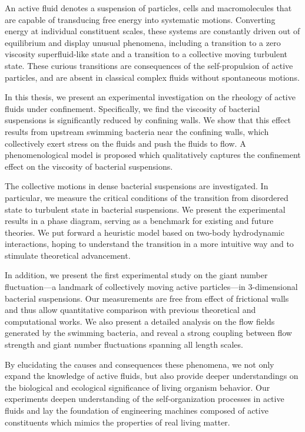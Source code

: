 An active fluid denotes a suspension of particles, cells and macromolecules that are capable of transducing free energy into systematic motions. Converting energy at individual constituent scales, these systems are constantly driven out of equilibrium and display unusual phenomena, including a transition to a zero viscosity superfluid-like state and a transition to a collective moving turbulent state. These curious transitions are consequences of the self-propulsion of active particles, and are absent in classical complex fluids without spontaneous motions.

In this thesis, we present an experimental investigation on the rheology of active fluids under confinement. Specifically, we find the viscosity of bacterial suspensions is significantly reduced by confining walls. We show that this effect results from upstream swimming bacteria near the confining walls, which collectively exert stress on the fluids and push the fluids to flow. A phenomenological model is proposed which qualitatively captures the confinement effect on the viscosity of bacterial suspensions.


The collective motions in dense bacterial suspensions are investigated. In particular, we measure the critical conditions of the transition from disordered state to turbulent state in bacterial suspensions. We present the experimental results in a phase diagram, serving as a benchmark for existing and future theories. We put forward a heuristic model based on two-body hydrodynamic interactions, hoping to understand the transition in a more intuitive way and to stimulate theoretical advancement.

In addition, we present the first experimental study on the giant number fluctuation---a landmark of collectively moving active particles---in 3-dimensional bacterial suspensions. Our measurements are free from effect of frictional walls and thus allow quantitative comparison with previous theoretical and computational works. We also present a detailed analysis on the flow fields generated by the swimming bacteria, and reveal a strong coupling between flow strength and giant number fluctuations spanning all length scales.

By elucidating the causes and consequences these phenomena, we not only expand the knowledge of active fluids, but also provide deeper understandings on the biological and ecological significance of living organism behavior. Our experiments deepen understanding of the self-organization processes in active fluids and lay the foundation of engineering machines composed of active constituents which mimics the properties of real living matter. 
